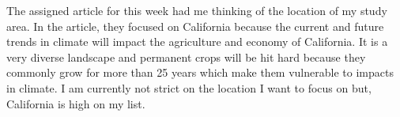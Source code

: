 \documentclass[a4paper,10pt]{article}
\begin{document}
The assigned article for this week had me thinking of the location of my study area. In the article, they focused on California
because the current and future trends in climate will impact the agriculture and economy of California. It is a very diverse
landscape and permanent crops will be hit hard because they commonly grow for more than 25 years which make them vulnerable to
impacts in climate. I am currently not strict on the location I want to focus on but, California is high on my list. \cite{pathak2018climate}



\end{document}

